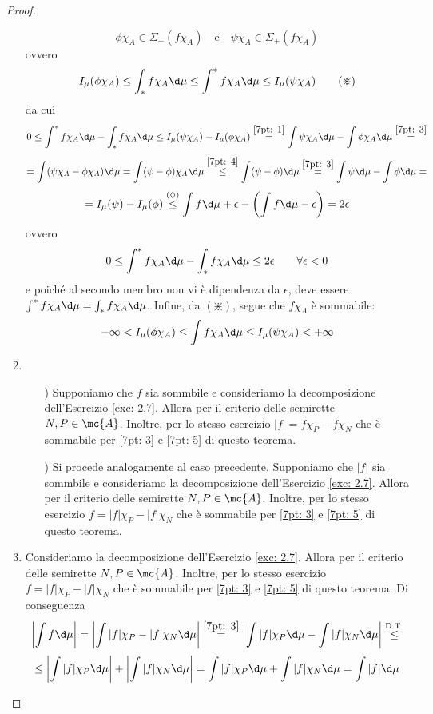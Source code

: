 \begin{proof}
\begin{enumerate}
        \[\phi\chi_A \in \Sigma_-(f\chi_A)\quad \text{e} \quad \psi\chi_A \in \Sigma_+(f\chi_A)\]
        ovvero
        \[I_\mu(\phi\chi_A)\leq \int_*f\chi_A\d\mu\leq \int^*f\chi_A\d\mu\leq I_\mu(\psi\chi_A)\tag{$\divideontimes$}\]
        da cui
        \[0\leq \int^*f\chi_A\d\mu-\int_*f\chi_A\d\mu \leq I_\mu(\psi\chi_A)-I_\mu(\phi\chi_A) \overset{\ref{7pt: 1}}{=} \int\psi\chi_A\d\mu-\int\phi\chi_A\d\mu \overset{\ref{7pt: 3}}{=}\]
        \[=\int(\psi\chi_A-\phi\chi_A)\d\mu = \int (\psi-\phi)\chi_A\d\mu \overset{\ref{7pt: 4}}{\leq}\int(\psi-\phi)\d\mu \overset{\ref{7pt: 3}}{=} \int \psi\d\mu-\int\phi\d\mu = \]
        \[=I_{\mu}(\psi)-I_\mu(\phi)\overset{(\lozenge)}{\leq}\int f\d\mu+\epsilon -\left(\int f \d\mu -\epsilon\right) = 2\epsilon \]
        ovvero
        \[0\leq \int^*f\chi_A\d\mu-\int_*f\chi_A\d\mu\leq 2\epsilon\qquad\forall \epsilon <0\]
        e poiché al secondo membro non vi è dipendenza da $\epsilon$, deve essere $\int^*f\chi_A\d\mu=\int_*f\chi_A\d\mu$. Infine, da $(\divideontimes)$, segue che $f\chi_A$ è sommabile:
        \[-\infty<I_\mu(\phi\chi_A)\leq \int f\chi_A\d\mu\leq I_\mu(\psi\chi_A)<+\infty\]
        \item \begin{itemize}
            \item[\say{$\Rarr$})] Supponiamo che $f$ sia sommbile e consideriamo la decomposizione dell'Esercizio \ref{exc: 2.7}. Allora per il criterio delle semirette $N,P\in \mc{A}$. Inoltre, per lo stesso esercizio $|f|=f\chi_P-f\chi_N$ che è sommabile per \ref{7pt: 3} e \ref{7pt: 5} di questo teorema. 
            \item[\say{$\Larr$})] Si procede analogamente al caso precedente. Supponiamo che $|f|$ sia sommbile e consideriamo la decomposizione dell'Esercizio \ref{exc: 2.7}. Allora per il criterio delle semirette $N,P\in \mc{A}$. Inoltre, per lo stesso esercizio $f=|f|\chi_P-|f|\chi_N$ che è sommabile per \ref{7pt: 3} e \ref{7pt: 5} di questo teorema. 
        \end{itemize}
        \item Consideriamo la decomposizione dell'Esercizio \ref{exc: 2.7}. Allora per il criterio delle semirette $N,P\in \mc{A}$. Inoltre, per lo stesso esercizio $f=|f|\chi_P-|f|\chi_N$ che è sommabile per \ref{7pt: 3} e \ref{7pt: 5} di questo teorema. Di conseguenza
        \[\left|\int f\d\mu\right| = \left|\int |f|\chi_P-|f|\chi_N \d\mu\right| \overset{\ref{7pt: 3}}{=}\left|\int |f|\chi_P\d\mu-\int|f|\chi_N \d\mu\right| \overset{\text{D.T.}}\leq \]
        \[\leq \left|\int |f|\chi_P\d\mu\right|+\left|\int|f|\chi_N \d\mu\right| = \int |f|\chi_P\d\mu+\int|f|\chi_N \d\mu = \int |f|\d\mu\qedhere\]
    \end{enumerate}
\end{proof}

